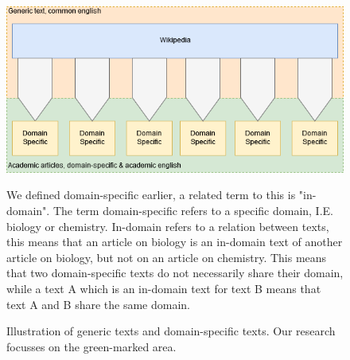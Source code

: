 \documentclass[../../Thesis.tex]{subfiles}
\begin{document}
\begin{figure}[hbt]
\includegraphics[width=6.5in]{Plots/domain_specification_graph}
\caption{Illustration of generic texts and domain-specific texts. Our research focusses on the green-marked area.}\label{figure:domainPlot}
We defined domain-specific earlier, a related term to this is "in-domain". The term domain-specific refers to a specific domain, I.E. biology or chemistry. In-domain refers to a relation between texts, this means that an article on biology is an in-domain text of another article on biology, but not on an article on chemistry. This means that two domain-specific texts do not necessarily share their domain, while a text A which is an in-domain text for text B means that text A and B share the same domain.
\end{figure}
\end{document}
